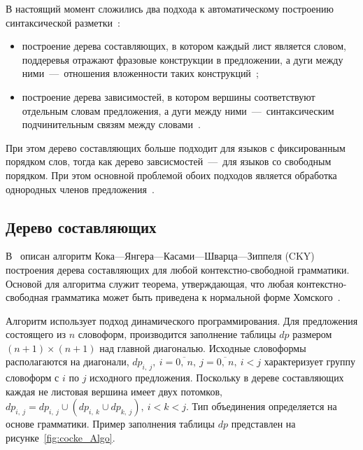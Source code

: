 В настоящий момент сложились два подхода к автоматическому построению синтаксической разметки~\cite{bolshakova2017avtomaticheskaya}:
\begin{itemize}
	\item построение дерева составляющих, в котором каждый лист является словом, поддеревья отражают фразовые конструкции в предложении, а дуги между ними~---~отношения вложенности таких конструкций~\cite{makarov2022cockeyoungerkasamischwartzzippelalgorithmrelatives,younger1967recognition,jurafsky2026speech};
	\item построение дерева зависимостей, в котором вершины соответствуют отдельным словам предложения, а дуги между ними~---~синтаксическим подчинительным связям между словами~\cite{nivre2003efficient,nivre2007maltparser,covington2001fundamental,kiselev2017sintaksicheskij,jurafsky2026speech}.
\end{itemize}

При этом дерево составляющих больше подходит для языков с фиксированным порядком слов, тогда как дерево завсисмостей~---~для языков со свободным порядком. При этом основной проблемой обоих подходов является обработка однородных членов предложения~\cite{bolshakova2017avtomaticheskaya}.

\subsection{Дерево составляющих}

В~\cite{jurafsky2026speech} описан алгоритм Кока---Янгера---Касами---Шварца---Зиппеля (CKY) построения дерева составляющих для любой контекстно-свободной грамматики. Основой для алгоритма служит теорема, утверждающая, что любая контекстно-свободная грамматика может быть приведена к нормальной форме Хомского~\cite{makarov2022cockeyoungerkasamischwartzzippelalgorithmrelatives}.

Алгоритм использует подход динамического программирования. Для предложения состоящего из $n$ словоформ, производится заполнение таблицы $dp$ размером $(n+1)\times(n+1)$ над главной диагональю. Исходные словоформы располагаются на диагонали, $dp_{i,\ j},\ i=\overline{0,\ n},\ j=\overline{0,\ n},\ i<j$ характеризует группу словоформ с $i$ по $j$ исходного предложения. Поскольку в дереве составляющих каждая не листовая вершина имеет двух потомков, $dp_{i,\ j}=dp_{i,\ j} \cup (dp_{i,\ k}\cup dp_{k,\ j}),\ i<k<j$. Тип объединения определяется на основе грамматики. Пример заполнения таблицы $dp$ представлен на рисунке~\ref{fig:cocke_Algo}.

